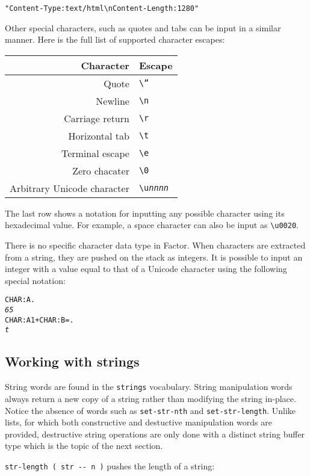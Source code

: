 \documentclass[english]{article}
\providecommand{\tabularnewline}{\\}
\begin{document}
\begin{alltt}
"Content-Type: text/html\textbackslash{}nContent-Length: 1280"
\end{alltt}
Other special characters, such as quotes and tabs can be input in
a similar manner. Here is the full list of supported character escapes:

\begin{tabular}{|r|l|}
\hline 
Character&
Escape\tabularnewline
\hline
\hline 
Quote&
\texttt{\textbackslash{}''}\tabularnewline
\hline 
Newline&
\texttt{\textbackslash{}n}\tabularnewline
\hline 
Carriage return&
\texttt{\textbackslash{}r}\tabularnewline
\hline 
Horizontal tab&
\texttt{\textbackslash{}t}\tabularnewline
\hline 
Terminal escape&
\texttt{\textbackslash{}e}\tabularnewline
\hline 
Zero chacater&
\texttt{\textbackslash{}0}\tabularnewline
\hline 
Arbitrary Unicode character&
\texttt{\textbackslash{}u}\texttt{\emph{nnnn}}\tabularnewline
\hline
\end{tabular}

The last row shows a notation for inputting any possible character
using its hexadecimal value. For example, a space character can also
be input as \texttt{\textbackslash{}u0020}.

There is no specific character data type in Factor. When characters
are extracted from a string, they are pushed on the stack as integers.
It is possible to input an integer with a value equal to that of a
Unicode character using the following special notation:

\begin{alltt}
CHAR: A .
\emph{65}
CHAR: A 1 + CHAR: B = .
\emph{t}
\end{alltt}

\subsection{Working with strings}

String words are found in the \texttt{strings} vocabulary. String
manipulation words always return a new copy of a string rather than
modifying the string in-place. Notice the absence of words such as
\texttt{set-str-nth} and \texttt{set-str-length}. Unlike lists, for
which both constructive and destuctive manipulation words are provided,
destructive string operations are only done with a distinct string
buffer type which is the topic of the next section.

\texttt{str-length ( str -{}- n )} pushes the length of a string:
\end{document}
